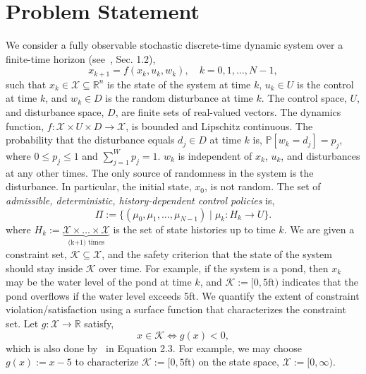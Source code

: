 \documentclass[letterpaper, 10 pt, conference]{ieeeconf}  %
\begin{document}
\section{Problem Statement}
\label{sec::problem}
We consider a fully observable stochastic discrete-time dynamic system over a finite-time horizon (see~\cite{bertsekas2005dynamic}, Sec. 1.2),
\begin{equation}
x_{k+1} = f(x_k,u_k,w_k), \quad k = 0, 1, \dots, N-1,
\label{sys}
\end{equation}
such that $x_k \in \mathcal{X} \subseteq \mathbb{R}^n$ is the state of the system at time $k$,
$u_k \in U$ is the control at time $k$, and
$w_k \in D$ is the random disturbance at time $k$. The control space, $U$, and disturbance space, $D$, are finite sets of real-valued vectors.
The dynamics function, $f : \mathcal{X} \times U \times D \rightarrow \mathcal{X}$, is bounded and Lipschitz continuous.
The probability that the disturbance equals $d_j \in D$ at time $k$ is, $\mathbb{P}[w_k = d_j] = p_j$, 
where $0 \leq p_j \leq 1$ and $\sum_{j=1}^W p_j = 1$.
$w_k$ is independent of $x_k$, $u_k$, and disturbances at any other times.  
The only source of randomness in the system is the disturbance.
In particular, the initial state, $x_0$, is not random. 
The set of \textit{admissible, deterministic, history-dependent control policies} is,
%
\begin{equation}
\Pi := \big\{ (\mu_0, \mu_1, \dots, \mu_{N-1}) \mid \mu_k: H_k \rightarrow U \big\}.
\label{pi}
\end{equation}
%
where $H_k := \underbrace{\mathcal{X} \times \hdots \times \mathcal{X}}_{\text{(k+1) times}}$ is the set of state histories up to time $k$.
We are given a constraint set, $\mathcal{K} \subseteq \mathcal{X}$, and the safety criterion that 
the state of the system should stay inside $\mathcal{K}$ over time. 
For example, if the system is a pond, then $x_k$ may be the water level of the pond at time $k$,
and $\mathcal{K} := [0, 5\text{ft})$ indicates that the pond overflows if the water level exceeds 5ft.
We quantify the extent of constraint violation/satisfaction using a surface function that characterizes the constraint set.
Let $g: \mathcal{X} \rightarrow \mathbb{R}$ satisfy,
%
\begin{equation}
x \in \mathcal{K} \iff g(x) < 0,
\label{g}
\end{equation}
%
which is also done by~\cite{EECS-2018-41} in Equation 2.3.
For example, we may choose $g(x) := x - 5$ to characterize $\mathcal{K} := [0, 5\text{ft})$ on the state space, 
$\mathcal{X} := [0, \infty)$.
\end{document}
